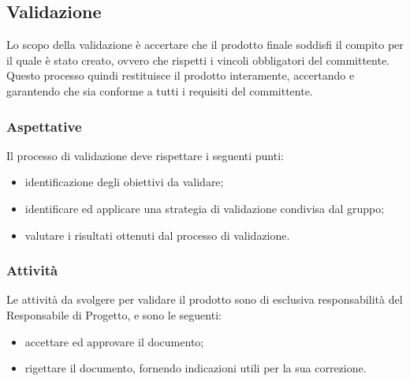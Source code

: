 \subsection{Validazione}
Lo scopo della validazione è accertare che il prodotto finale soddisfi il compito per il quale è stato creato, ovvero che rispetti i vincoli obbligatori del committente. Questo processo quindi restituisce il prodotto interamente, accertando e garantendo che sia conforme a tutti i requisiti del committente.

\subsubsection{Aspettative}
Il processo di validazione deve rispettare i seguenti punti:
\begin{itemize}
	\item identificazione degli obiettivi da validare;
	\item identificare ed applicare una strategia di validazione condivisa dal gruppo;
	\item valutare i risultati ottenuti dal processo di validazione.
\end{itemize}

\subsubsection{Attività}
Le attività da svolgere per validare il prodotto sono di esclusiva responsabilità del Responsabile di Progetto, e sono le seguenti:
\begin{itemize}
	\item accettare ed approvare il documento;
	\item rigettare il documento, fornendo indicazioni utili per la sua correzione.
\end{itemize}


